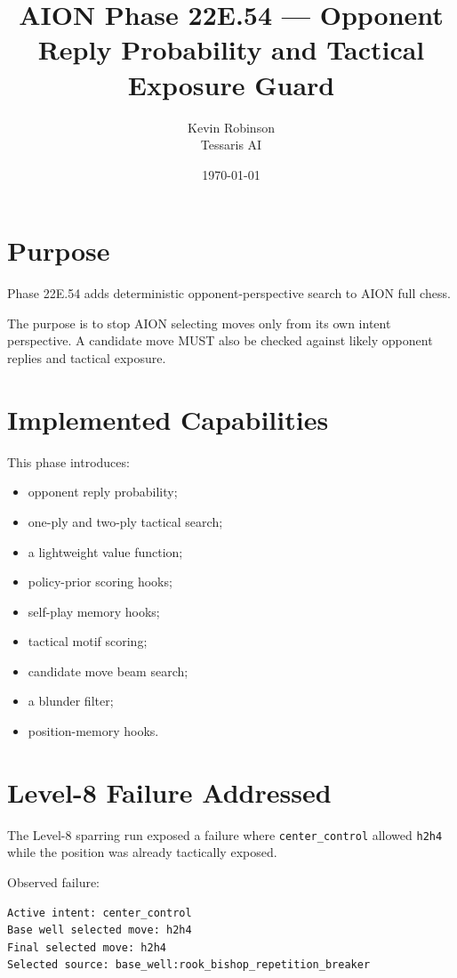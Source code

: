 \documentclass[11pt,a4paper]{article}
\title{\textbf{AION Phase 22E.54 --- Opponent Reply Probability and Tactical Exposure Guard}}
\author{Kevin Robinson\\Tessaris AI}
\date{\today}
\begin{document}
\maketitle

\section{Purpose}

Phase 22E.54 adds deterministic opponent-perspective search to AION full chess.

The purpose is to stop AION selecting moves only from its own intent perspective. A candidate move MUST also be checked against likely opponent replies and tactical exposure.

\section{Implemented Capabilities}

This phase introduces:

\begin{itemize}
  \item opponent reply probability;
  \item one-ply and two-ply tactical search;
  \item a lightweight value function;
  \item policy-prior scoring hooks;
  \item self-play memory hooks;
  \item tactical motif scoring;
  \item candidate move beam search;
  \item a blunder filter;
  \item position-memory hooks.
\end{itemize}

\section{Level-8 Failure Addressed}

The Level-8 sparring run exposed a failure where \texttt{center\_control} allowed \texttt{h2h4} while the position was already tactically exposed.

Observed failure:

\begin{verbatim}
Active intent: center_control
Base well selected move: h2h4
Final selected move: h2h4
Selected source: base_well:rook_bishop_repetition_breaker
\end{verbatim}
\end{document}
